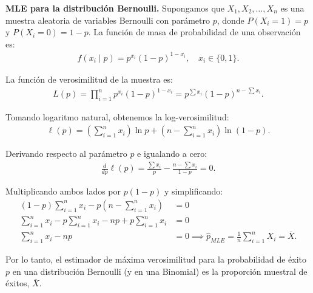 \begin{ejemplo}
	\textbf{MLE para la distribución Bernoulli.}
	Supongamos que $X_1, X_2, \ldots, X_n$ es una muestra aleatoria de variables Bernoulli con parámetro $p$, donde $P(X_i = 1) = p$ y $P(X_i = 0) = 1-p$. La función de masa de probabilidad de una observación es:
	\begin{align}
		f(x_i \mid p) = p^{x_i}(1-p)^{1-x_i}, \quad x_i \in \{0, 1\}.
	\end{align}

	La función de verosimilitud de la muestra es:
	\begin{align}
		L(p) = \prod_{i=1}^n p^{x_i}(1-p)^{1-x_i} = p^{\sum x_i}(1-p)^{n - \sum x_i}.
	\end{align}

	Tomando logaritmo natural, obtenemos la log-verosimilitud:
	\begin{align}
		\ell(p) = \left(\sum_{i=1}^n x_i\right) \ln p + \left(n - \sum_{i=1}^n x_i\right) \ln(1-p).
	\end{align}

	Derivando respecto al parámetro $p$ e igualando a cero:
	\begin{align}
		\frac{d}{dp} \ell(p) = \frac{\sum x_i}{p} - \frac{n - \sum x_i}{1-p} = 0.
	\end{align}

	Multiplicando ambos lados por $p(1-p)$ y simplificando:
	\begin{align}
		(1-p)\sum_{i=1}^n x_i - p\left(n - \sum_{i=1}^n x_i\right) &= 0 \\
		\sum_{i=1}^n x_i - p\sum_{i=1}^n x_i - np + p\sum_{i=1}^n x_i &= 0 \\
		\sum_{i=1}^n x_i - np &= 0 \implies \hat{p}_{MLE} = \frac{1}{n} \sum_{i=1}^n X_i = \bar{X}.
	\end{align}

	Por lo tanto, el estimador de máxima verosimilitud para la probabilidad de éxito $p$ en una distribución Bernoulli (y en una Binomial) es la proporción muestral de éxitos, $\bar{X}$.
\end{ejemplo}

